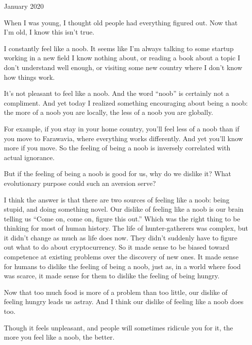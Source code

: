 January 2020

When I was young, I thought old people had everything figured out. Now
that I'm old, I know this isn't true.

I constantly feel like a noob. It seems like I'm always talking to some
startup working in a new field I know nothing about, or reading a book
about a topic I don't understand well enough, or visiting some new
country where I don't know how things work.

It's not pleasant to feel like a noob. And the word ``noob'' is
certainly not a compliment. And yet today I realized something
encouraging about being a noob: the more of a noob you are locally, the
less of a noob you are globally.

For example, if you stay in your home country, you'll feel less of a
noob than if you move to Farawavia, where everything works differently.
And yet you'll know more if you move. So the feeling of being a noob is
inversely correlated with actual ignorance.

But if the feeling of being a noob is good for us, why do we dislike it?
What evolutionary purpose could such an aversion serve?

I think the answer is that there are two sources of feeling like a noob:
being stupid, and doing something novel. Our dislike of feeling like a
noob is our brain telling us ``Come on, come on, figure this out.''
Which was the right thing to be thinking for most of human history. The
life of hunter-gatherers was complex, but it didn't change as much as
life does now. They didn't suddenly have to figure out what to do about
cryptocurrency. So it made sense to be biased toward competence at
existing problems over the discovery of new ones. It made sense for
humans to dislike the feeling of being a noob, just as, in a world where
food was scarce, it made sense for them to dislike the feeling of being
hungry.

Now that too much food is more of a problem than too little, our dislike
of feeling hungry leads us astray. And I think our dislike of feeling
like a noob does too.

Though it feels unpleasant, and people will sometimes ridicule you for
it, the more you feel like a noob, the better.

